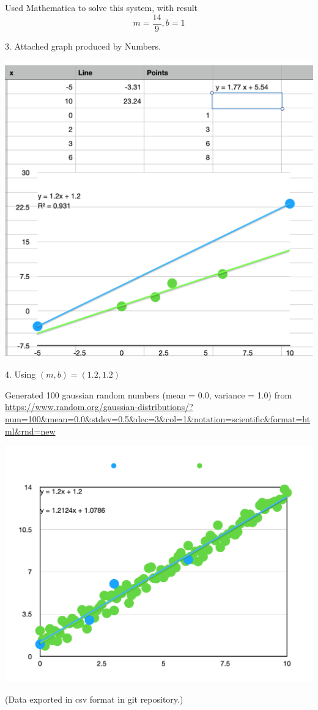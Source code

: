 \documentclass[12pt,letterpaper]{hmcpset}
\begin{document}
\begin{solution}
Used Mathematica to solve this system, with result
\[
  m = \frac{14}{9}, b = 1
\]

 3. Attached graph produced by Numbers.

\includegraphics[scale=0.4]{hw1-p2-graph1.png}

\newpage

4. Using $(m,b) = (1.2, 1.2)$

Generated 100 gaussian random numbers (mean = 0.0, variance = 1.0) from \url{https://www.random.org/gaussian-distributions/?num=100&mean=0.0&stdev=0.5&dec=3&col=1&notation=scientific&format=html&rnd=new}

\includegraphics[scale=0.4]{hw1-p2-graph2.png}

(Data exported in csv format in git repository.)


    \vfill
\end{solution}
\newpage
\end{document}
